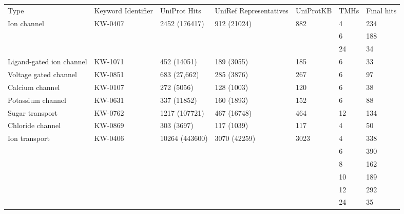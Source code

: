 \begin{table}[htbp]
\begin{tabular}{lllllll}
  \footnotesize
Type                     & Keyword Identifier & UniProt Hits   & UniRef Representatives &  UniProtKB & TMHs & Final hits \\
Ion channel              & KW-0407            & 2452 (176417)  & 912 (21024)            & 882                & 4    & 234        \\
                         &                    &                &                        &                    & 6    & 188        \\
                         &                    &                &                        &                    & 24   & 34         \\
Ligand-gated ion channel & KW-1071            & 452 (14051)    & 189 (3055)             & 185                & 6    & 33         \\
Voltage gated channel    & KW-0851            & 683 (27,662)   & 285 (3876)             & 267                & 6    & 97         \\
Calcium channel          & KW-0107            & 272 (5056)     & 128 (1003)             & 120                & 6    & 38         \\
Potassium channel        & KW-0631            & 337 (11852)    & 160 (1893)             & 152                & 6    & 88         \\
Sugar transport          & KW-0762            & 1217 (107721)  & 467 (16748)            & 464                & 12   & 134        \\
Chloride channel         & KW-0869            & 303 (3697)     & 117 (1039)             & 117                & 4    & 50         \\
Ion transport            & KW-0406            & 10264 (443600) & 3070 (42259)           & 3023               & 4    & 338        \\
                         &                    &                &                        &                    & 6    & 390        \\
                         &                    &                &                        &                    & 8    & 162        \\
                         &                    &                &                        &                    & 10   & 189        \\
                         &                    &                &                        &                    & 12   & 292        \\
                         &                    &                &                        &                    & 24   & 35
\end{tabular}
\label{table:datasetsizes}
\end{table}


